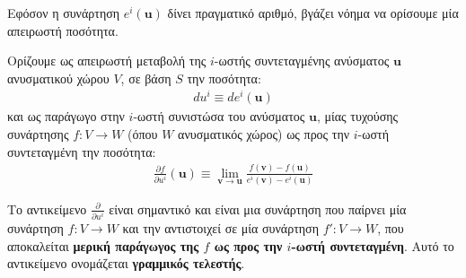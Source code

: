 \documentclass[main.tex]{subfiles}
\begin{document}
	Εφόσον η συνάρτηση $e^i(\boldsymbol{u})$ δίνει πραγματικό αριθμό, βγάζει νόημα να ορίσουμε μία απειρωστή ποσότητα.
	\begin{definition}
		Ορίζουμε ως απειρωστή μεταβολή της $i$-ωστής συντεταγμένης ανύσματος $\boldsymbol{u}$ ανυσματικού χώρου $V$, σε βάση $S$ την ποσότητα:
		\begin{align*}
			du^i \equiv de^i(\boldsymbol{u})
		\end{align*}
		και ως παράγωγο στην $i$-ωστή συνιστώσα του ανύσματος $\boldsymbol{u}$, μίας τυχούσης συνάρτησης ${f:V\rightarrow W}$ (όπου $W$ ανυσματικός χώρος) ως προς την $i$-ωστή συντεταγμένη την ποσότητα:
		\begin{align*}
			\frac{\partial f}{\partial u^i}(\boldsymbol{u}) \equiv \underset{\boldsymbol{v} \rightarrow \boldsymbol{u}}{\lim}\frac{f(\boldsymbol{v}) - f(\boldsymbol{u})}{e^i(\boldsymbol{v}) - e^i(\boldsymbol{u})}
		\end{align*}
	\end{definition}
	Το αντικείμενο $\frac{\partial}{\partial u^i}$ είναι σημαντικό και είναι μια συνάρτηση που παίρνει μία συνάρτηση ${f:V\rightarrow W}$ και την αντιστοιχεί σε μία συνάρτηση ${f':V\rightarrow W}$, που αποκαλείται \textbf{μερική παράγωγος της $f$ ως προς την $i$-ωστή συντεταγμένη}. Αυτό το αντικείμενο ονομάζεται \textbf{γραμμικός τελεστής}. 
\end{document}

